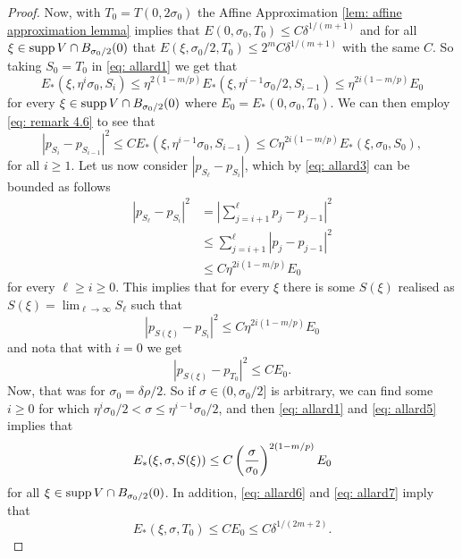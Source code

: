 \begin{proof}
Now, with $T_0 = T(0,2\sigma_0)$ the Affine Approximation \cref{lem: affine approximation lemma} implies that $E(0,\sigma_0, T_0) \le C\delta^{1/(m+1)}$ and for all $\xi \in \operatorname{supp} V \cap B_{\sigma_0/2}(0)$ that $E(\xi, \sigma_0/2, T_0) \le 2^m C \delta^{1/(m+1)}$ with the same $C$. So taking $S_0 = T_0$ in \eqref{eq: allard1} we get that
\[
    E_*(\xi, \eta^i\sigma_0, S_i) \le \eta^{2(1-m/p)}E_*(\xi, \eta^{i-1}\sigma_0/2, S_{i-1}) \le \eta^{2i(1-m/p)}E_0
\]
for every $\xi \in \operatorname{supp} V \cap B_{\sigma_0/2}(0)$ where $E_0 = E_*(0, \sigma_0, T_0)$. We can then employ \eqref{eq: remark 4.6} to see that
\begin{equation}
    |p_{S_i} - p_{S_{i-1}}|^2 \le CE_*(\xi, \eta^{i-1}\sigma_0, S_{i-1}) \le C \eta^{2i(1-m/p)}E_*(\xi, \sigma_0, S_0),\label{eq: allard3}
\end{equation}
for all $i \ge 1$. Let us now consider $|p_{S_{\ell}}-p_{S_i}|$, which by \eqref{eq: allard3} can be bounded as follows
\begin{align}
    |p_{S_{\ell}}-p_{S_i}|^2 &= \left| \sum_{j=i+1}^{\ell} p_j - p_{j-1} \right|^2 \nonumber \\
    &\le \sum_{j=i+1}^{\ell} |p_j - p_{j-1}|^2 \nonumber \\
    &\le C \eta^{2i(1-m/p)}E_0
\end{align}
for every $\ell \ge i \ge 0$. This implies that for every $\xi$ there is some $S(\xi)$ realised as $S(\xi) = \lim_{\ell \to \infty}S_{\ell}$ such that
\begin{equation}
    |p_{S(\xi)} - p_{S_i}|^2 \le C \eta^{2i(1-m/p)}E_0 \label{eq: allard5}
\end{equation}
and nota that with $i=0$ we get
\begin{equation}
    |p_{S(\xi)} - p_{T_0}|^2 \le C E_0. \label{eq: allard6}
\end{equation}
Now, that was for $\sigma_0 = \delta\rho/2$. So if $\sigma \in (0, \sigma_0/2]$ is arbitrary, we can find some $i \ge 0$ for which $\eta^i\sigma_0/2 < \sigma \le \eta^{i-1}\sigma_0/2$, and then \eqref{eq: allard1} and \eqref{eq: allard5} implies that
\begin{equation}
    E_*(\xi, \sigma, S(\xi)) \le C\left(\frac{\sigma}{\sigma_0}\right)^{2(1-m/p)}E_0\label{eq: allard7}
\end{equation}
for all $\xi \in \operatorname{supp} V \cap B_{\sigma_0/2}(0)$. In addition, \eqref{eq: allard6} and \eqref{eq: allard7} imply that
\begin{equation}
    E_*(\xi, \sigma, T_0) \le CE_0 \le C \delta^{1/(2m+2)}. \label{eq: allard8}

\end{equation}
\end{proof}
